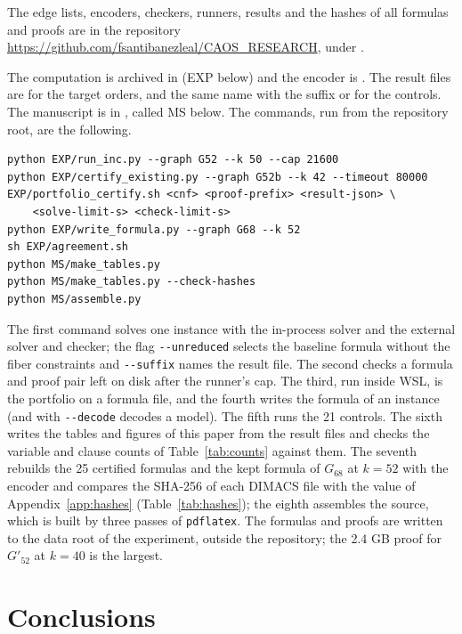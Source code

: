 \documentclass[11pt]{article}
\theoremstyle{definition}
\theoremstyle{remark}
\newcommand{\Gb}{G'_{52}}
\newcommand{\Gsix}{G_{68}}
\begin{document}
The edge lists, encoders, checkers, runners, results and the hashes of all formulas and proofs are in the repository \url{https://github.com/fsantibanezleal/CAOS_RESEARCH}, under . \raggedright The computation is archived in  (EXP below) and the encoder is .
The result files are  for the target orders, and the same name with the suffix  or  for the controls. The manuscript is in , called MS below. The commands, run from the repository root, are the following.
\begin{verbatim}
python EXP/run_inc.py --graph G52 --k 50 --cap 21600
python EXP/certify_existing.py --graph G52b --k 42 --timeout 80000
EXP/portfolio_certify.sh <cnf> <proof-prefix> <result-json> \
    <solve-limit-s> <check-limit-s>
python EXP/write_formula.py --graph G68 --k 52
sh EXP/agreement.sh
python MS/make_tables.py
python MS/make_tables.py --check-hashes
python MS/assemble.py
\end{verbatim}
The first command solves one instance with the in-process solver and the external solver and checker; the flag \texttt{-{}-unreduced} selects the baseline formula without the fiber constraints and \texttt{-{}-suffix} names the result file. The second checks a formula and proof pair left on disk after the runner's cap. The third, run inside WSL, is the portfolio on a formula file, and
the fourth writes the formula of an instance (and with \texttt{-{}-decode} decodes a model). The fifth runs the 21 controls. The sixth writes the tables and figures of this paper from the result files and checks the variable and clause counts of Table~\ref{tab:counts} against them. The seventh rebuilds the 25 certified formulas and the kept formula of $\Gsix$ at $k = 52$ with the encoder and compares the SHA-256
of each DIMACS file with the value of Appendix~\ref{app:hashes} (Table~\ref{tab:hashes}); the eighth assembles the source, which is built by three passes of \texttt{pdflatex}. The formulas and proofs are written to the data root of the experiment, outside the repository; the 2.4 GB proof for $\Gb$ at $k = 40$ is the largest.

\section{Conclusions}\label{sec:conclusions}
\end{document}
